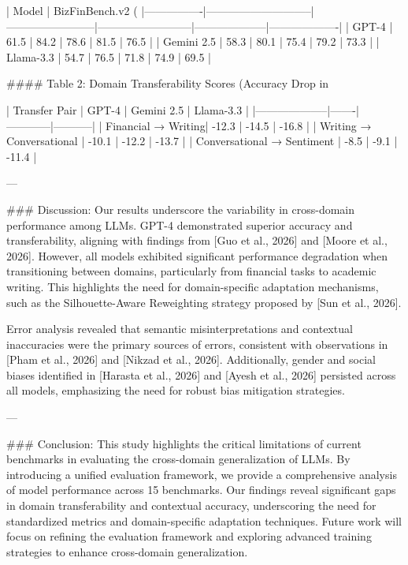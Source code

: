 | Model          | BizFinBench.v2 (%
|----------------|-----------------------------|------------------------|--------------------------|--------------------|-------------------|
| GPT-4          | 61.5                       | 84.2                  | 78.6                    | 81.5              | 76.5             |
| Gemini 2.5     | 58.3                       | 80.1                  | 75.4                    | 79.2              | 73.3             |
| Llama-3.3      | 54.7                       | 76.5                  | 71.8                    | 74.9              | 69.5             |

#### Table 2: Domain Transferability Scores (Accuracy Drop in %

| Transfer Pair      | GPT-4 | Gemini 2.5 | Llama-3.3 |
|--------------------|-------|------------|-----------|
| Financial → Writing| -12.3 | -14.5      | -16.8     |
| Writing → Conversational | -10.1 | -12.2      | -13.7     |
| Conversational → Sentiment | -8.5  | -9.1       | -11.4     |

---

### Discussion:
Our results underscore the variability in cross-domain performance among LLMs. GPT-4 demonstrated superior accuracy and transferability, aligning with findings from [Guo et al., 2026] and [Moore et al., 2026]. However, all models exhibited significant performance degradation when transitioning between domains, particularly from financial tasks to academic writing. This highlights the need for domain-specific adaptation mechanisms, such as the Silhouette-Aware Reweighting strategy proposed by [Sun et al., 2026].

Error analysis revealed that semantic misinterpretations and contextual inaccuracies were the primary sources of errors, consistent with observations in [Pham et al., 2026] and [Nikzad et al., 2026]. Additionally, gender and social biases identified in [Harasta et al., 2026] and [Ayesh et al., 2026] persisted across all models, emphasizing the need for robust bias mitigation strategies.

---

### Conclusion:
This study highlights the critical limitations of current benchmarks in evaluating the cross-domain generalization of LLMs. By introducing a unified evaluation framework, we provide a comprehensive analysis of model performance across 15 benchmarks. Our findings reveal significant gaps in domain transferability and contextual accuracy, underscoring the need for standardized metrics and domain-specific adaptation techniques. Future work will focus on refining the evaluation framework and exploring advanced training strategies to enhance cross-domain generalization.

